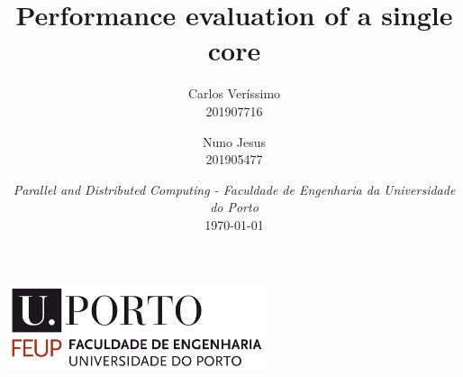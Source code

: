 \documentclass[10pt, titlepage]{extarticle}
\begin{document}
\begin{center}
    \includegraphics[width=3in]{../misc/feup.png}
\end{center}

\title{Performance evaluation of a single core}
\author{
    Carlos Veríssimo \\ 201907716
    \and
    Nuno Jesus \\ 201905477
}


\date{%
    \textit{Parallel and Distributed Computing - Faculdade de Engenharia da Universidade do Porto} \\[2ex]%
    \today
}

{\let\newpage\relax\maketitle}

\clearpage
\setcounter{page}{1}

\pagebreak

\tableofcontents
\end{document}
